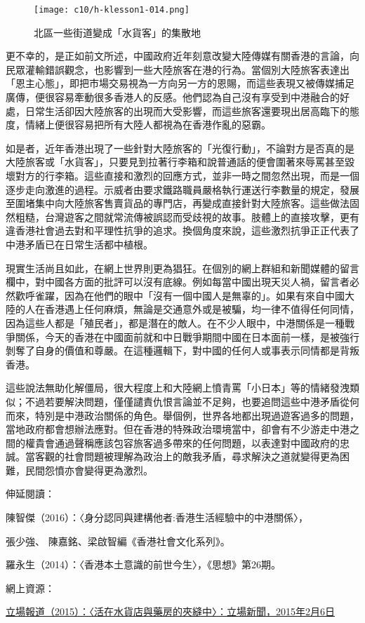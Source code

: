 \begin{figure}[htbp]
    \centering
    \texttt{[image: c10/h-klesson1-014.png]}
    \caption{北區一些街道變成「水貨客」的集散地} 
\end{figure}

更不幸的，是正如前文所述，中國政府近年刻意改變大陸傳媒有關香港的言論，向民眾灌輸錯誤觀念，也影響到一些大陸旅客在港的行為。當個別大陸旅客表達出「恩主心態」，即把市場交易視為一方向另一方的恩賜，而這些表現又被傳媒捕足廣傳，便很容易牽動很多香港人的反感。他們認為自己沒有享受到中港融合的好處，日常生活卻因大陸旅客的出現而大受影響，而這些旅客還要現出居高臨下的態度，情緒上便很容易把所有大陸人都視為在香港作亂的惡霸。

如是者，近年香港出現了一些針對大陸旅客的「光復行動」，不論對方是否真的是大陸旅客或「水貨客」，只要見到拉著行李箱和說普通話的便會圍著來辱罵甚至毀壞對方的行李箱。這些直接和激烈的回應方式，並非一時之間忽然出現，而是一個逐步走向激進的過程。示威者由要求鐵路職員嚴格執行運送行李數量的規定，發展至圍堵集中向大陸旅客售賣貨品的專門店，再變成直接針對大陸旅客。這些做法固然粗糙，台灣遊客之間就常流傳被誤認而受歧視的故事。肢體上的直接攻擊，更有違香港社會過去對和平理性抗爭的追求。換個角度來說，這些激烈抗爭正正代表了中港矛盾已在日常生活都中植根。

現實生活尚且如此，在網上世界則更為猖狂。在個別的網上群組和新聞媒體的留言欄中，對中國各方面的批評可以沒有底線。例如每當中國出現天災人禍，留言者必然歡呼雀躍，因為在他們的眼中「沒有一個中國人是無辜的」。如果有來自中國大陸的人在香港遇上任何麻煩，無論是交通意外或是被騙，均一律不值得任何同情，因為這些人都是「殖民者」，都是潛在的敵人。在不少人眼中，中港關係是一種戰爭關係，今天的香港在中國面前就和中日戰爭期間中國在日本面前一樣，是被強行剝奪了自身的價值和尊嚴。在這種邏輯下，對中國的任何人或事表示同情都是背叛香港。

這些說法無助化解僵局，很大程度上和大陸網上憤青罵「小日本」等的情緒發洩類似；不過若要解決問題，僅僅譴責仇恨言論並不足夠，也要追問這些中港矛盾從何而來，特別是中港政治關係的角色。舉個例，世界各地都出現過遊客過多的問題，當地政府都會想辦法應對。但在香港的特殊政治環境當中，卻會有不少游走中港之間的權貴會通過聲稱應該包容旅客過多帶來的任何問題，以表達對中國政府的忠誠。當客觀的社會問題被理解為政治上的敵我矛盾，尋求解決之道就變得更為困難，民間怨憤亦會變得更為激烈。


伸延閱讀：

陳智傑（2016）：〈身分認同與建構他者:香港生活經驗中的中港關係〉，

張少強、 陳嘉銘、梁啟智編《香港社會文化系列》。

羅永生（2014）：〈香港本土意識的前世今生〉，《思想》第26期。

網上資源：

\href{https://thestandnews.com/society/上水貨客-5-活在水貨店與藥房的夾縫中/}{立場報道（2015）：〈活在水貨店與藥房的夾縫中〉：立場新聞，2015年2月6日}